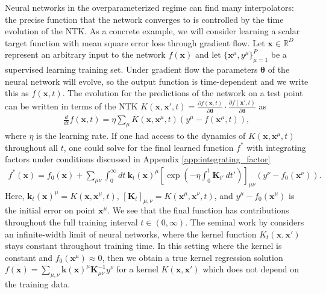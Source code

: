 \documentclass{article} %
\def\x{\bm x}
\begin{document}
Neural networks in the overparameterized regime can find many interpolators: the precise function that the network converges to is controlled by the time evolution of the NTK. As a concrete example, we will consider learning a scalar target function with mean square error loss through gradient flow. Let $\x \in \mathbb{R}^D$ represent an arbitrary input to the network $f(\x)$ and let $\{ \x^\mu, y^\mu\}_{\mu=1}^P$ be a supervised learning training set. Under gradient flow the parameters $\bm \theta$ of the neural network will evolve, so the output function is time-dependent and we write this as $f(\x,t)$. The evolution for the predictions of the network on a test point can be written in terms of the NTK $K(\x,\x',t) = \frac{\partial f(\x,t)}{\partial \bm \theta} \cdot \frac{\partial f(\x',t)}{\partial \bm\theta}$ as  
\begin{align}
    \frac{d}{dt} f(\x,t) = \eta \sum_{\mu} K(\x,\x^\mu, t) (y^\mu - f(\x^\mu,t)),
\end{align}
where $\eta$ is the learning rate.
If one had access to the dynamics of $K(\x,\x^\mu,t)$ throughout all $t$, one could solve for the final learned function $f^*$ with integrating factors under conditions discussed in Appendix \ref{app:integrating_factor}
\begin{align}\label{eq:integ_factor}
    f^*(\x) = f_0(\x) +  \sum_{\mu \nu} \int_{0}^{\infty} dt \ \bm k_t(\bm x)^\mu \left[\exp\left( - \eta \int_{0}^{t} \bm K_{t'}\, dt'  \right) \right]_{\mu \nu} \left( y^\nu - f_0(\x^\nu) \right).
\end{align}
Here, $\bm k_t(\x)^{\mu} = K(\bm x,\x^\mu,t)$, $[\bm K_t]_{\mu,\nu} = K(\bm x^\mu,\bm x^{\nu},t )$, and $y^\mu - f_0(\x^\mu)$ is the initial error on point $\bm x^\mu$.  We see that the final function has contributions throughout the full training interval $t \in (0,\infty)$.  The seminal work by \cite{Jacot2018NeuralTK} considers an infinite-width limit of neural networks, where the kernel function $K_t(\x,\x')$ stays constant throughout training time. In this setting where the kernel is constant and $f_0(\x^\mu) \approx 0$, then we obtain a true kernel regression solution $f(\x) = \sum_{\mu, \nu} \bm k(\x)^\mu \bm K^{-1}_{\mu \nu} y^\nu$ for a kernel $K(\x,\x')$ which does not depend on the training data.
\end{document}

